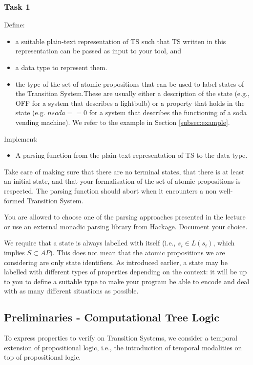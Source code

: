 \documentclass{article}
\begin{document}
\subsubsection*{Task 1}
Define:
\begin{itemize}
    \item a suitable plain-text representation of TS such that TS written in this representation
          can be passed as input to your tool, and
    \item a data type to represent them. 
    \item the type of the set of atomic propositions that can be used to label states of the           Transition System.These are usually either a description of the state (e.g., OFF for a         system that describes a lightbulb) or a property that holds in the state (e.g. $nsoda == 0$     for a system that describes the functioning of a soda vending machine). We refer to  the       example in Section \ref{subsec:example}.
\end{itemize} 
Implement: 
\begin{itemize}
    \item A parsing function from the plain-text representation of TS to the data type.
\end{itemize}
Take care of making sure that there are no terminal states, that there is at least an initial state, and that your formalisation of the set of atomic propositions is respected. The parsing function should abort when it encounters a non well-formed Transition System.

You are allowed to choose one of the parsing approaches presented in the lecture or 
use an external monadic parsing library from Hackage. Document your choice.

We require that a state is always labelled with itself 
(i.e., $s_i \in L(s_i)$, which implies $S \subset AP$). This does not mean that the atomic propositions we are considering are only state identifiers. As introduced earlier, a state may be labelled with different types of properties depending on the context: it will be up to you to define a suitable type to make your program be able to encode and deal with as many different situations as possible.

\subsection{Preliminaries - Computational Tree Logic}
\label{subsec-ctl}
To express properties to verify on Transition Systems, we consider a temporal extension of propositional logic, i.e., the introduction of temporal modalities on top of propositional logic. 
\end{document}
